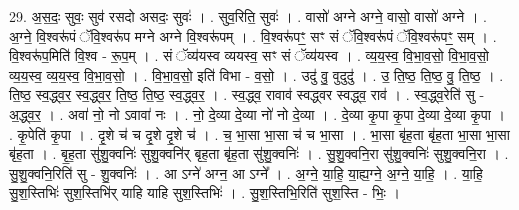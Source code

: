 \documentclass[17pt]{extarticle}
\begin{document}
29. अ॒स॒दः॒ सुवः॒ सुव॑ रसदो असदः॒ सुवः॑ । . सुव॒रिति॒ सुवः॑ । . वासो॑ अग्ने अग्ने॒ वासो॒ वासो॑ अग्ने । . अ॒ग्ने॒ वि॒श्वरू॑पं ॅवि॒श्वरू॑प मग्ने अग्ने वि॒श्वरू॑पम् । . वि॒श्वरू॑पꣳ॒॒ सꣳ सं ॅवि॒श्वरू॑पं ॅवि॒श्वरू॑पꣳ॒॒ सम् । . वि॒श्वरू॑प॒मिति॑ वि॒श्व - रू॒प॒म् । . सं ॅव्य॑यस्व व्ययस्व॒ सꣳ सं ॅव्य॑यस्व । . व्य॒य॒स्व॒ वि॒भा॒व॒सो॒ वि॒भा॒व॒सो॒ व्य॒य॒स्व॒ व्य॒य॒स्व॒ वि॒भा॒व॒सो॒ । . वि॒भा॒व॒सो॒ इति॑ विभा - व॒सो॒ । . उदु॑ वु॒ वुदुदु॑ । . उ॒ ति॒ष्ठ॒ ति॒ष्ठ॒ वु॒ ति॒ष्ठ॒ । . ति॒ष्ठ॒ स्व॒द्ध्व॒र॒ स्व॒द्ध्व॒र॒ ति॒ष्ठ॒ ति॒ष्ठ॒ स्व॒द्ध्व॒र॒ । . स्व॒द्ध्व॒ रावाव॑ स्वद्ध्वर स्वद्ध्व॒ राव॑ । . स्व॒द्ध्व॒रेति॑ सु - अ॒द्ध्व॒र॒ । . अवा॑ नो॒ नो ऽवावा॑ नः । . नो॒ दे॒व्या दे॒व्या नो॑ नो दे॒व्या । . दे॒व्या कृ॒पा कृ॒पा दे॒व्या दे॒व्या कृ॒पा । . कृ॒पेति॑ कृ॒पा । . दृ॒शे च॑ च दृ॒शे दृ॒शे च॑ । . च॒ भा॒सा भा॒सा च॑ च भा॒सा । . भा॒सा बृ॑ह॒ता बृ॑ह॒ता भा॒सा भा॒सा बृ॑ह॒ता । . बृ॒ह॒ता सु॑शु॒क्वनिः॑ सुशु॒क्वनि॑र् बृह॒ता बृ॑ह॒ता सु॑शु॒क्वनिः॑ । . सु॒शु॒क्वनि॒रा सु॑शु॒क्वनिः॑ सुशु॒क्वनि॒रा । . सु॒शु॒क्वनि॒रिति॑ सु - शु॒क्वनिः॑ । . आ ऽग्ने॑ अग्न॒ आ ऽग्ने᳚ । . अ॒ग्ने॒ या॒हि॒ या॒ह्य॒ग्ने॒ अ॒ग्ने॒ या॒हि॒ । . या॒हि॒ सु॒श॒स्तिभिः॑ सुश॒स्तिभि॑र् याहि याहि सुश॒स्तिभिः॑ । . सु॒श॒स्तिभि॒रिति॑ सुश॒स्ति - भिः॒ । \newline
\end{document}
